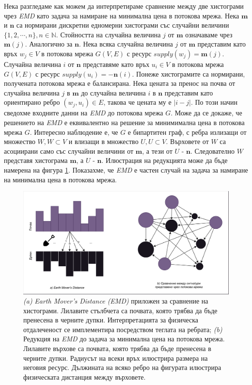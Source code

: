 \documentclass[a4paper,12pt]{article}
\begin{document}
Нека разгледаме как можем да интерпретираме сравнение между две хистограми чрез \textit{EMD} като задача за намиране на минимална цена в потокова мрежа. Нека $\mathbf{m}$ и $\mathbf{n}$ са нормирани дискретни едномерни хистограми със случайни величини $\{1, 2, \cdots, n\}, n \in \mathbb{N}$. Стойността на случайна величина $j$ от $\mathbf{m}$ означаваме чрез $\mathbf{m}(j)$. Аналогично за $\mathbf{n}$. Нека всяка случайна величина $j$ от $\mathbf{m}$ представим като връх $w_j \in V$ в потокова мрежа $G(V, E)$ с ресурс $supply(w_j) = \mathbf{m}(j)$. Случайна величина $i$ от $\mathbf{n}$ представяме като връх $u_i \in V$ в потокова мрежа $G(V, E)$ с ресурс $supply(u_i) = -\mathbf{n}(i)$. Понеже хистограмите са нормирани, получената потокова мрежа е балансирана. Нека цената за пренос на почва от случайна величина $j$ в $\mathbf{m}$ до случайна величина $i$ в $\mathbf{n}$ представим като ориентирано ребро $(w_j, u_i) \in E$, такова че цената му е $|i - j|$. По този начин сведохме входните данни на \textit{EMD} до потокова мрежа $G$. Може да се докаже, че решението на \textit{EMD} е еквивалентно на решение за минимимална цена в потокова мрежа $G$. Интересно наблюдение е, че $G$ е бипартитен граф, с ребра излизащи от множество $W, W \subset V$ и влизащи в множество $U, U \subset V$. Върховете от $W$ са асоциирани само със случайни величини от $\mathbf{m}$, а тези от $U$ - $\mathbf{n}$. Следователно $W$ представя хистограма $\mathbf{m}$, а $U$ - $\mathbf{n}$. Илюстрация на редукцията може да бъде намерена на фигура \ref{fig:emdandreduction}. Показахме, че \textit{EMD} е частен случай на задача за намиране на минимална цена в потокова мрежа.

\begin{figure}[ht]
    \centering
    \includegraphics[width=\textwidth]{emd_and_reduction.png}
    \caption{\textit{(a)} \textit{Earth Mover's Distance (EMD)} приложен за сравнение на хистограми. Лилавите стълбчета са почвата, която трябва да бъде пренесена в черните дупки. Интерпретацията за физическа отдалеченост се имплементира посредством теглата на ребрата; \textit{(b)} Редукция на \textit{EMD} до задача за минимална цена на потокова мрежа. Лилавите върхове са почвата, която трябва да бъде пренесена в черните дупки. Радиусът на всеки връх илюстрира размера на неговия ресурс. Дължината на всяко ребро на фигурата илюстрира физическата дистанция между върховете.}
    \label{fig:emdandreduction}
\end{figure}
\end{document}
